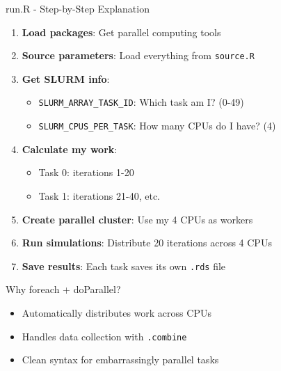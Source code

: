\documentclass[aspectratio=169]{beamer}
\begin{document}
\begin{frame}{run.R - Step-by-Step Explanation}
\begin{enumerate}
    \item \textbf{Load packages}: Get parallel computing tools
    
    \item \textbf{Source parameters}: Load everything from \texttt{source.R}
    
    \item \textbf{Get SLURM info}: 
    \begin{itemize}
        \item \texttt{SLURM\_ARRAY\_TASK\_ID}: Which task am I? (0-49)
        \item \texttt{SLURM\_CPUS\_PER\_TASK}: How many CPUs do I have? (4)
    \end{itemize}
    
    \item \textbf{Calculate my work}: 
    \begin{itemize}
        \item Task 0: iterations 1-20
        \item Task 1: iterations 21-40, etc.
    \end{itemize}
    
    \item \textbf{Create parallel cluster}: Use my 4 CPUs as workers
    
    \item \textbf{Run simulations}: Distribute 20 iterations across 4 CPUs
    
    \item \textbf{Save results}: Each task saves its own \texttt{.rds} file
\end{enumerate}

\begin{exampleblock}{Why foreach + doParallel?}
\begin{itemize}
    \item Automatically distributes work across CPUs
    \item Handles data collection with \texttt{.combine}
    \item Clean syntax for embarrassingly parallel tasks
\end{itemize}
\end{exampleblock}
\end{frame}
\end{document}
